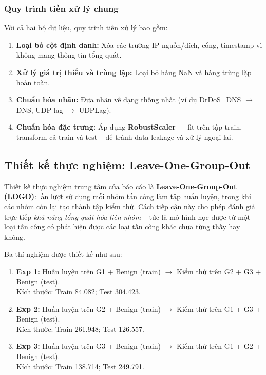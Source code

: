 \subsubsection{Quy trình tiền xử lý chung}

Với cả hai bộ dữ liệu, quy trình tiền xử lý bao gồm:
\begin{enumerate}
    \item \textbf{Loại bỏ cột định danh:} Xóa các trường IP nguồn/đích, cổng, timestamp vì không mang thông tin tổng quát.
    \item \textbf{Xử lý giá trị thiếu và trùng lặp:} Loại bỏ hàng NaN và hàng trùng lặp hoàn toàn.
    \item \textbf{Chuẩn hóa nhãn:} Đưa nhãn về dạng thống nhất (ví dụ DrDoS\_DNS $\to$ DNS, UDP-lag $\to$ UDPLag).
    \item \textbf{Chuẩn hóa đặc trưng:} Áp dụng \textbf{RobustScaler}~\cite{pedregosa2011scikit} -- fit trên tập train, transform cả train và test -- để tránh data leakage và xử lý ngoại lai.
\end{enumerate}

\subsection{Thiết kế thực nghiệm: Leave-One-Group-Out}

Thiết kế thực nghiệm trung tâm của báo cáo là \textbf{Leave-One-Group-Out (LOGO)}: lần lượt sử dụng mỗi nhóm tấn công làm tập huấn luyện, trong khi các nhóm còn lại tạo thành tập kiểm thử. Cách tiếp cận này cho phép đánh giá trực tiếp \textit{khả năng tổng quát hóa liên nhóm} -- tức là mô hình học được từ một loại tấn công có phát hiện được các loại tấn công khác chưa từng thấy hay không.

Ba thí nghiệm được thiết kế như sau:
\begin{enumerate}
    \item \textbf{Exp 1:} Huấn luyện trên G1 + Benign (train) $\to$ Kiểm thử trên G2 + G3 + Benign (test).\\
    Kích thước: Train 84.082; Test 304.423.
    \item \textbf{Exp 2:} Huấn luyện trên G2 + Benign (train) $\to$ Kiểm thử trên G1 + G3 + Benign (test).\\
    Kích thước: Train 261.948; Test 126.557.
    \item \textbf{Exp 3:} Huấn luyện trên G3 + Benign (train) $\to$ Kiểm thử trên G1 + G2 + Benign (test).\\
    Kích thước: Train 138.714; Test 249.791.
\end{enumerate}

